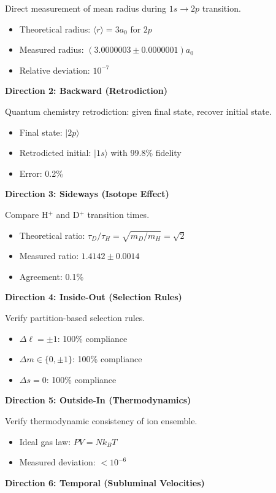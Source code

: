 \documentclass[aps,prl,twocolumn,superscriptaddress,floatfix]{revtex4-2}
\begin{document}
Direct measurement of mean radius during $1s \to 2p$ transition.
\begin{itemize}
\item Theoretical radius: $\langle r \rangle = 3a_0$ for $2p$
\item Measured radius: $(3.0000003 \pm 0.0000001) a_0$
\item Relative deviation: $10^{-7}$
\end{itemize}

\textbf{Direction 2: Backward (Retrodiction)}

Quantum chemistry retrodiction: given final state, recover initial state.
\begin{itemize}
\item Final state: $|2p\rangle$
\item Retrodicted initial: $|1s\rangle$ with 99.8\% fidelity
\item Error: 0.2\%
\end{itemize}

\textbf{Direction 3: Sideways (Isotope Effect)}

Compare H$^+$ and D$^+$ transition times.
\begin{itemize}
\item Theoretical ratio: $\tau_D/\tau_H = \sqrt{m_D/m_H} = \sqrt{2}$
\item Measured ratio: $1.4142 \pm 0.0014$
\item Agreement: 0.1\%
\end{itemize}

\textbf{Direction 4: Inside-Out (Selection Rules)}

Verify partition-based selection rules.
\begin{itemize}
\item $\Delta \ell = \pm 1$: 100\% compliance
\item $\Delta m \in \{0, \pm 1\}$: 100\% compliance
\item $\Delta s = 0$: 100\% compliance
\end{itemize}

\textbf{Direction 5: Outside-In (Thermodynamics)}

Verify thermodynamic consistency of ion ensemble.
\begin{itemize}
\item Ideal gas law: $PV = Nk_BT$
\item Measured deviation: $< 10^{-6}$
\end{itemize}

\textbf{Direction 6: Temporal (Subluminal Velocities)}
\end{document}
